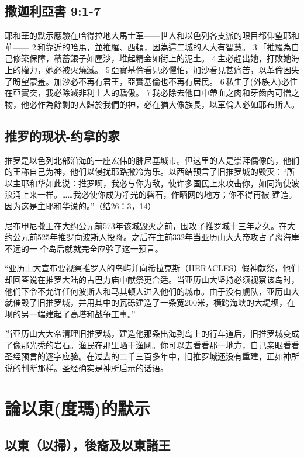 \subsection{撒迦利亞書 9:1-7}
耶和華的默示應驗在哈得拉地大馬士革——世人和以色列各支派的眼目都仰望耶和華—— 2 和靠近的哈馬，並推羅、西頓，因為這二城的人大有智慧。 3 「推羅為自己修築保障，積蓄銀子如塵沙，堆起精金如街上的泥土。 4 主必趕出她，打敗她海上的權力，她必被火燒滅。 5 亞實基倫看見必懼怕，加沙看見甚痛苦，以革倫因失了盼望蒙羞。加沙必不再有君王，亞實基倫也不再有居民。 6 私生子(外族人)必住在亞實突，我必除滅非利士人的驕傲。 7 我必除去他口中帶血之肉和牙齒內可憎之物，他必作為餘剩的人歸於我們的神，必在猶大像族長，以革倫人必如耶布斯人。


\subsection{推罗的现状-约拿的家}
推罗是以色列北部沿海的一座宏伟的腓尼基城市。但这里的人是崇拜偶像的，他们的王称自己为神，他们以侵扰耶路撒冷为乐。以西结预言了旧推罗城的毁灭：“所以主耶和华如此说：推罗啊，我必与你为敌，使许多国民上来攻击你，如同海使波浪涌上来一样。……我必使你成为净光的磐石，作晒网的地方；你不得再被 建造。因为这是主耶和华说的。”（结26：3，14）

尼布甲尼撒王在大约公元前573年该城毁灭之前，围攻了推罗城十三年之久。在大约公元前525年推罗向波斯人投降。之后在主前332年当亚历山大大帝攻占了离海岸不远的一 个岛后就就完全应验了这一预言。

“亚历山大宣布要视察推罗人的岛屿并向希拉克斯（HERACLES）假神献祭，他们却回答说在推罗大陆的古巴力庙中献祭更合适。当亚历山大坚持必须视察该岛时，他们下令不允许任何波斯人和马其顿人进入他们的城市。由于没有舰队，亚历山大就催毁了旧推罗城，并用其中的瓦砾建造了一条宽200米，横跨海峡的大堤坝，在坝的另一端建起了高塔和战争工事。”

当亚历山大大帝清理旧推罗城，建造他那条出海到岛上的行车道后，旧推罗城变成了像那光秃的岩石。渔民在那里晒干渔网。你可以去看看那一地方，自己亲眼看看圣经预言的逐字应验。在过去的二千三百多年中，旧推罗城还没有重建，正如神所说的判断那样。圣经确实是神所启示的话语。






\section{論以東(度瑪)的默示 }
\subsection{以東（以掃），後裔及以東諸王}
